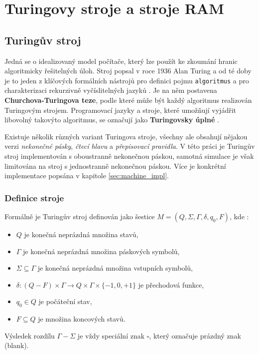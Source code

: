 \chapter{Turingovy stroje a stroje RAM}
\label{sec:theory}

\section{Turingův stroj}
Jedná se o idealizovaný model počítače, který lze použít ke zkoumání hranic algoritmicky řešitelných úloh. 
Stroj popsal v roce 1936 Alan Turing a od té doby je to jeden z klíčových formálních nástrojů pro
 definici pojmu \texttt{algoritmus} a pro charakterizaci rekurzivně vyčíslitelných jazyků \cite{geeksforgeeks_turing}.
Je na něm postavena \textbf{Churchova-Turingova teze}, podle které může být každý algoritmus realizován Turingovým strojem. 
Programovací jazyky a stroje, které umožňují vyjádřit libovolný takovýto algoritmus, se označují jako \textbf{Turingovsky úplné} \cite{sawa_teoreticka}.

Existuje několik různých variant Turingova stroje, všechny ale obsahují nějakou verzi \textit{nekonečné pásky}, \textit{čtecí hlavu} a \textit{přepisovací pravidla}.
V této práci je Turingův stroj implementován s oboustranně nekonečnou páskou, samotná simulace je však limitována na stroj s jednostranně nekonečnou páskou. 
Více je konkrétní implementace popsána v kapitole \ref{sec:machine_impl}.

\subsection{Definice stroje}
Formálně je Turingův stroj definován jako šestice $M = (Q, \Sigma, \Gamma, \delta, q_0, F)$, kde \cite{sawa_teoreticka}: 
\begin{itemize}
	\item $Q$ je konečná neprázdná množina stavů,
	\item $\Gamma$ je konečná neprázdná množina páskových symbolů,
	\item $\Sigma \subseteq \Gamma$ je konečná neprázdná množina vstupních symbolů,
	\item $\delta : (Q - F) \times \Gamma \rightarrow Q \times \Gamma \times \{-1, 0, +1\}$ je přechodová funkce,
	\item $q_0 \in Q$ je počáteční stav,
	\item $F \subseteq Q$ je množina koncových stavů.
\end{itemize}
Výsledek rozdílu $\Gamma - \Sigma$ je vždy speciální znak $\square$, který označuje prázdný znak (blank).


